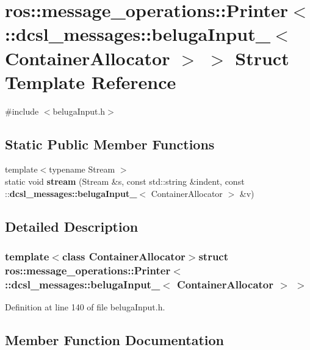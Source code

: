 \section{ros\-:\-:message\-\_\-operations\-:\-:\-Printer$<$ \-:\-:dcsl\-\_\-messages\-:\-:beluga\-Input\-\_\-$<$ \-Container\-Allocator $>$ $>$ \-Struct \-Template \-Reference}
\label{structros_1_1message__operations_1_1Printer_3_01_1_1dcsl__messages_1_1belugaInput___3_01ContainerAllocator_01_4_01_4}


{\ttfamily \#include $<$beluga\-Input.\-h$>$}

\subsection*{\-Static \-Public \-Member \-Functions}
\begin{DoxyCompactItemize}
\item 
{\footnotesize template$<$typename Stream $>$ }\\static void {\bf stream} (\-Stream \&s, const std\-::string \&indent, const \-::{\bf dcsl\-\_\-messages\-::beluga\-Input\-\_\-}$<$ \-Container\-Allocator $>$ \&v)
\end{DoxyCompactItemize}


\subsection{\-Detailed \-Description}
\subsubsection*{template$<$class Container\-Allocator$>$struct ros\-::message\-\_\-operations\-::\-Printer$<$ \-::dcsl\-\_\-messages\-::beluga\-Input\-\_\-$<$ Container\-Allocator $>$ $>$}



\-Definition at line 140 of file beluga\-Input.\-h.



\subsection{\-Member \-Function \-Documentation}

